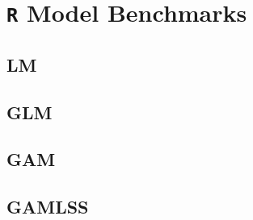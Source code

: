\section{\texttt{R} Model Benchmarks}

\begin{landscape}
\subsection{LM}



\subsection{GLM}



\subsection{GAM}



\subsection{GAMLSS}



\end{landscape}

